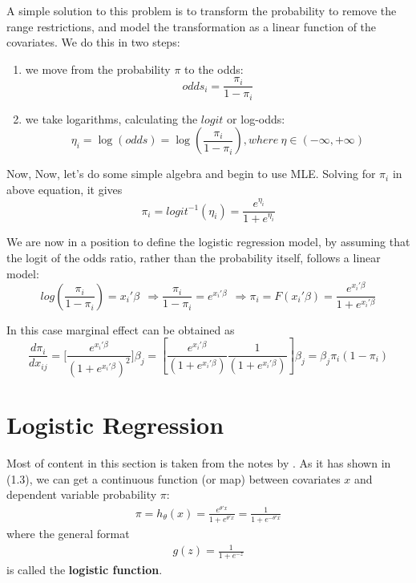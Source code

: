 \documentclass[12pt]{article}
\theoremstyle{definition}
\numberwithin{equation}{section}
\numberwithin{figure}{section}
\numberwithin{table}{section}
\begin{document}
A simple solution to this problem is to transform the probability to remove the range restrictions, and model the transformation as a linear function of the covariates. We do this in two steps:
\begin{enumerate}
	\item  we move from the probability $\pi$ to the odds: $$odds_i = \frac{\pi_i}{1-\pi_i}$$
	\item we take logarithms, calculating the $logit$ or log-odds: $$\eta_i = \log(odds) = \log (\frac{\pi_i}{1-\pi_i}), where \ \eta \in (-\infty, + \infty)$$
\end{enumerate}

Now, Now, let's do some simple algebra and begin to use MLE. Solving for $\pi_i$ in above equation, it gives
\begin{equation}
	\pi_i = logit^{-1}(\eta_i) = \frac{e^{\eta_i}}{1+e^{\eta_i}}
\end{equation}

We are now in a position to define the logistic regression model, by assuming that the logit of the odds ratio, rather than the probability itself, follows a linear model:
\begin{equation}
	log(\frac{\pi_i}{1-\pi_i}) = x_i' \beta \ \ \Rightarrow \frac{\pi_i}{1-\pi_i} = e^{x_i'\beta} \ \ \Rightarrow \pi_i = F(x_i'\beta) = \frac{e^{x_i'\beta}}{1+e^{x_i'\beta}}
\end{equation}

In this case marginal effect can be obtained as
\begin{equation}
	\frac{d\pi_i}{dx_{ij}} = \Big[ \frac{e^{x_i'\beta}}{(1+e^{x_i'\beta})^2} \Big]\beta_j = [\frac{e^{x_i'\beta }}{(1+e^{x_i'\beta})} \frac{1}{(1+e^{x_i'\beta})} ] \beta_j = \beta_j \pi_i(1-\pi_i)
\end{equation}

\section{Logistic Regression}

Most of content in this section is taken from the notes by \cite{ng2014cs229}. As it has shown in (1.3), we can get a continuous function (or map) between covariates $x$ and dependent variable probability $\pi$:
\begin{align}
  \pi = h_{\theta}(x) = \frac{e^{\theta' x}}{ 1 + e^{\theta' x}} = \frac{1}{1+ e^{-\theta' x}}
\end{align}
where the general format
\begin{align*}
  g(z) = \frac{1}{1+e^{-z}}
\end{align*}
is called the \textbf{logistic function}.
\end{document}
